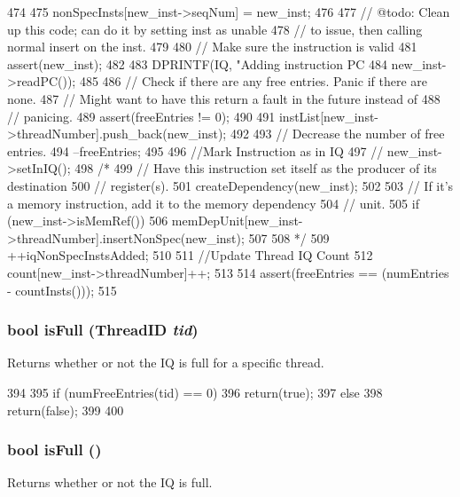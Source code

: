 \begin{DoxyCode}
474 {
475     nonSpecInsts[new_inst->seqNum] = new_inst;
476 
477     // @todo: Clean up this code; can do it by setting inst as unable
478     // to issue, then calling normal insert on the inst.
479 
480     // Make sure the instruction is valid
481     assert(new_inst);
482 
483     DPRINTF(IQ, "Adding instruction PC %
484             new_inst->readPC());
485 
486     // Check if there are any free entries.  Panic if there are none.
487     // Might want to have this return a fault in the future instead of
488     // panicing.
489     assert(freeEntries != 0);
490 
491     instList[new_inst->threadNumber].push_back(new_inst);
492 
493     // Decrease the number of free entries.
494     --freeEntries;
495 
496     //Mark Instruction as in IQ
497 //    new_inst->setInIQ();
498 /*
499     // Have this instruction set itself as the producer of its destination
500     // register(s).
501     createDependency(new_inst);
502 
503     // If it's a memory instruction, add it to the memory dependency
504     // unit.
505     if (new_inst->isMemRef()) {
506         memDepUnit[new_inst->threadNumber].insertNonSpec(new_inst);
507     }
508 */
509     ++iqNonSpecInstsAdded;
510 
511     //Update Thread IQ Count
512     count[new_inst->threadNumber]++;
513 
514     assert(freeEntries == (numEntries - countInsts()));
515 }
\end{DoxyCode}
\hypertarget{classInstQueue_a30fac732df9b3fda011c7329a112cb31}{
\subsubsection[{isFull}]{\setlength{\rightskip}{0pt plus 5cm}bool isFull ({\bf ThreadID} {\em tid})}}
\label{classInstQueue_a30fac732df9b3fda011c7329a112cb31}
Returns whether or not the IQ is full for a specific thread. 


\begin{DoxyCode}
394 {
395     if (numFreeEntries(tid) == 0) {
396         return(true);
397     } else {
398         return(false);
399     }
400 }
\end{DoxyCode}
\hypertarget{classInstQueue_a3e70330939fdfc4dbc2f60c1a660584d}{
\subsubsection[{isFull}]{\setlength{\rightskip}{0pt plus 5cm}bool isFull ()}}
\label{classInstQueue_a3e70330939fdfc4dbc2f60c1a660584d}
Returns whether or not the IQ is full. 


